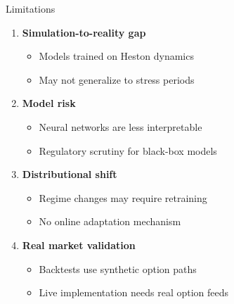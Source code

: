 \documentclass[aspectratio=169,11pt]{beamer}
\begin{document}
\begin{frame}{Limitations}
\begin{enumerate}
    \item \textbf{Simulation-to-reality gap}
    \begin{itemize}
        \item Models trained on Heston dynamics
        \item May not generalize to stress periods
    \end{itemize}
    
    \vspace{0.2cm}
    \item \textbf{Model risk}
    \begin{itemize}
        \item Neural networks are less interpretable
        \item Regulatory scrutiny for black-box models
    \end{itemize}
    
    \vspace{0.2cm}
    \item \textbf{Distributional shift}
    \begin{itemize}
        \item Regime changes may require retraining
        \item No online adaptation mechanism
    \end{itemize}
    
    \vspace{0.2cm}
    \item \textbf{Real market validation}
    \begin{itemize}
        \item Backtests use synthetic option paths
        \item Live implementation needs real option feeds
    \end{itemize}
\end{enumerate}
\end{frame}
\end{document}
